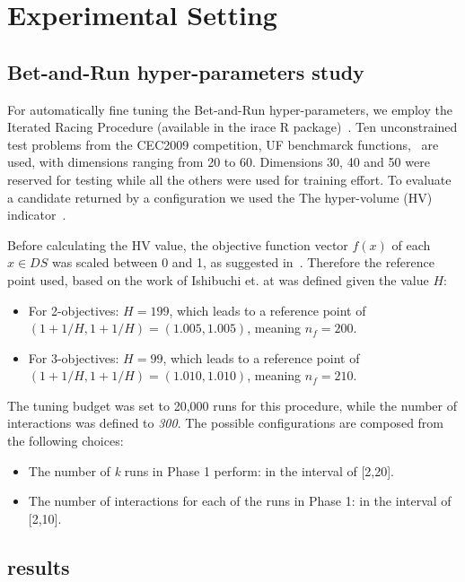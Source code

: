 \section{Experimental Setting}


\subsection{Bet-and-Run hyper-parameters study}

For automatically fine tuning the Bet-and-Run hyper-parameters, we employ the Iterated Racing Procedure (available in the irace R package)~\cite{bezerra2016automatic}. Ten unconstrained test problems from the CEC2009 competition, UF benchmarck functions,~\cite{zhang2008multiobjective} are used, with dimensions ranging from 20 to 60. Dimensions 30, 40 and 50 were reserved for testing while all the others were used for training effort. To evaluate a candidate returned by a configuration we used the The hyper-volume (HV) indicator~\cite{zitzler1998multiobjective}.

Before calculating the HV value, the objective function vector $f(x)$ of each $x \in DS$ was scaled between 0 and 1, as suggested in~\cite{ishibuchi2018specify}. Therefore the reference point used, based on the work of Ishibuchi et. at was defined given the value $H$:
\begin{itemize}
	\item For 2-objectives: $H = 199$, which leads to a reference point of $(1+1/H, 1+1/H) = (1.005, 1.005)$, meaning $n_f = 200$.
	\item For 3-objectives: $H = 99$, which leads to a reference point of $(1+1/H, 1+1/H) = (1.010, 1.010)$, meaning $n_f = 210$.
\end{itemize}

The tuning budget was set to 20,000 runs for this procedure, while the number of interactions was defined to \textit{300}. The possible configurations are composed from the following choices:
\begin{itemize}
	\item The number of  \textit{k} runs in Phase 1 perform: in the interval of [2,20].
	\item The number of interactions for each of the runs in Phase 1: in the interval of [2,10].
\end{itemize}

\subsection{results}

